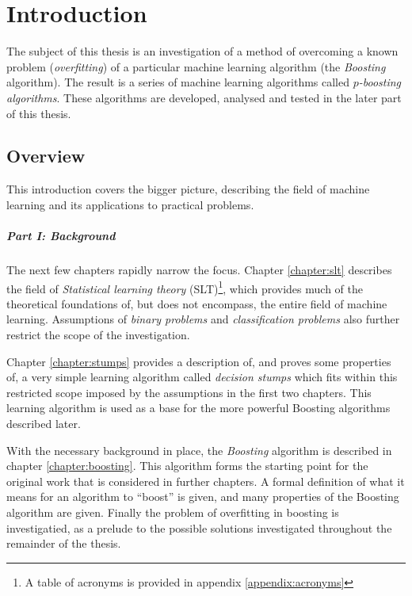 
\chapter{Introduction}

The subject of this thesis is an investigation of a method of
overcoming a known problem (\emph{overfitting}) of a particular
machine learning algorithm (the \emph{Boosting} algorithm).  The
result is a series of machine learning algorithms called
\emph{$p$-boosting algorithms}.  These algorithms are developed,
analysed and tested in the later part of this thesis.

\section{Overview}

This introduction covers the bigger picture,
describing the field of machine learning and its applications to
practical problems.

\paragraph{Part I: Background}

The next few chapters rapidly narrow the focus.  Chapter
\ref{chapter:slt} describes the field of \emph{Statistical learning
theory} (SLT)\footnote{A table of acronyms is provided in appendix
\ref{appendix:acronyms}}, which provides much of the theoretical
foundations of, but does not encompass, the entire field of machine
learning.  Assumptions of \emph{binary problems} and
\emph{classification problems} also further restrict the scope of the
investigation.

Chapter \ref{chapter:stumps} provides a description of, and proves
some properties of, a very simple learning algorithm called
\emph{decision stumps} which fits within this restricted scope imposed
by the assumptions in the first two chapters.  This learning algorithm
is used as a base for the more powerful Boosting algorithms described
later.

With the necessary background in place, the \emph{Boosting} algorithm
is described in chapter \ref{chapter:boosting}.  This algorithm forms
the starting point for the original work that is considered in further
chapters.  A formal definition of what it means for an algorithm to
``boost'' is given, and many properties of the Boosting algorithm are
given.  Finally the problem of overfitting in boosting is
investigatied, as a prelude to the possible solutions investigated
throughout the remainder of the thesis.

